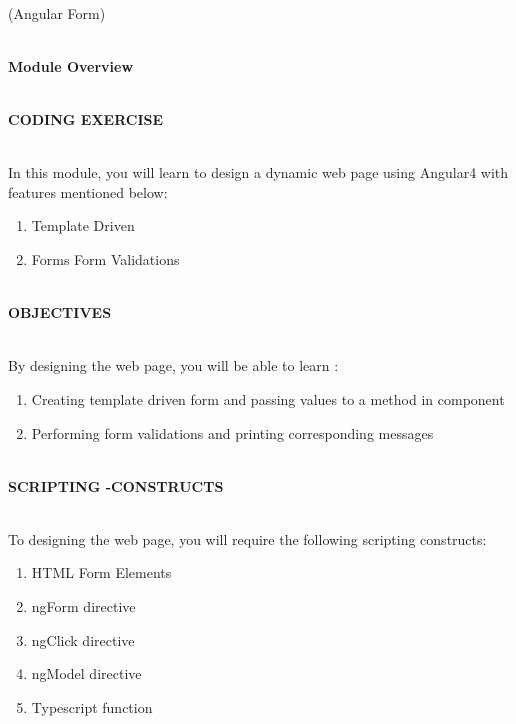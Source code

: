 \documentclass{article}
\begin{document}
\begin{center}
	\noindent \\ {\huge  (Angular Form)}
\end{center}


\noindent 

\noindent \\ {\LARGE \textbf{Module Overview}}

\noindent 

\noindent \\ {\large \textbf{CODING EXERCISE}}

\noindent 

\noindent \\ In this module, you will learn to design a dynamic web page using Angular4 with features mentioned below:

\noindent 

\begin{enumerate}
	\item Template Driven 
	\item Forms Form Validations
\end{enumerate}


\noindent \\ {\large \textbf{OBJECTIVES}}

\noindent 

\noindent \\ By designing the web page, you will be able to learn :
\begin{enumerate}
	\item Creating template driven form and passing values to a method in component 
	\item Performing form validations and printing corresponding messages
\end{enumerate}

\noindent \\ {\large \textbf{SCRIPTING -CONSTRUCTS}}

\noindent 

\noindent \\ To designing the web page, you will require the following scripting constructs:

\begin{enumerate}
	\item HTML Form Elements 
	\item ngForm directive
	\item ngClick directive
	\item ngModel directive
	\item Typescript function
\end{enumerate}
\end{document}
